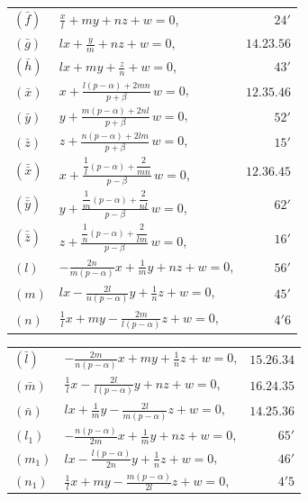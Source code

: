 \documentclass[11pt,a4paper]{book}
\begin{document}
\begin{center}
\begin{tabular}{@{}l@{\qquad}l@{\qquad}r@{}}
$(\bar{f})$ & $\displaystyle \frac{x}{l} + my + nz + w = 0$, & $24'$ \\[4pt]
$(\bar{g})$ & $\displaystyle lx + \frac{y}{m} + nz + w = 0$, & $14.23.56$ \\[4pt]
$(\bar{h})$ & $\displaystyle lx + my + \frac{z}{n} + w = 0$, & $43'$ \\[4pt]
$(\bar{x})$ & $\displaystyle x + \frac{l(p - \alpha) + 2mn}{p + \beta}\,w = 0$, & $12.35.46$ \\[4pt]
$(\bar{y})$ & $\displaystyle y + \frac{m(p - \alpha) + 2nl}{p + \beta}\,w = 0$, & $52'$ \\[4pt]
$(\bar{z})$ & $\displaystyle z + \frac{n(p - \alpha) + 2lm}{p + \beta}\,w = 0$, & $15'$ \\[4pt]
$(\bar{\bar{x}})$ & $\displaystyle x + \frac{\dfrac{1}{l}(p - \alpha) + \dfrac{2}{mn}}{p - \beta}\,w = 0$, & $12.36.45$ \\[4pt]
$(\bar{\bar{y}})$ & $\displaystyle y + \frac{\dfrac{1}{m}(p - \alpha) + \dfrac{2}{nl}}{p - \beta}\,w = 0$, & $62'$ \\[4pt]
$(\bar{\bar{z}})$ & $\displaystyle z + \frac{\dfrac{1}{n}(p - \alpha) + \dfrac{2}{lm}}{p - \beta}\,w = 0$, & $16'$ \\[4pt]
$(l)$ & $\displaystyle -\frac{2n}{m(p - \alpha)}x + \frac{1}{m}y + nz + w = 0$, & $56'$ \\[4pt]
$(m)$ & $\displaystyle lx - \frac{2l}{n(p - \alpha)}y + \frac{1}{n}z + w = 0$, & $45'$ \\[4pt]
$(n)$ & $\displaystyle \frac{1}{l}x + my - \frac{2m}{l(p - \alpha)}z + w = 0$, & $4'6$
\end{tabular}
\end{center}

\begin{center}
\begin{tabular}{@{}l@{\qquad}l@{\qquad}r@{}}
$(\bar{l})$ & $\displaystyle -\frac{2m}{n(p - \alpha)}x + my + \frac{1}{n}z + w = 0$, & $15.26.34$ \\[4pt]
$(\bar{m})$ & $\displaystyle \frac{1}{l}x - \frac{2l}{l(p - \alpha)}y + nz + w = 0$, & $16.24.35$ \\[4pt]
$(\bar{n})$ & $\displaystyle lx + \frac{1}{m}y - \frac{2l}{m(p - \alpha)}z + w = 0$, & $14.25.36$ \\[4pt]
$(l_1)$ & $\displaystyle -\frac{n(p - \alpha)}{2m}x + \frac{1}{m}y + nz + w = 0$, & $65'$ \\[4pt]
$(m_1)$ & $\displaystyle lx - \frac{l(p - \alpha)}{2n}y + \frac{1}{n}z + w = 0$, & $46'$ \\[4pt]
$(n_1)$ & $\displaystyle \frac{1}{l}x + my - \frac{m(p - \alpha)}{2l}z + w = 0$, & $4'5$
\end{tabular}
\end{center}
\end{document}
